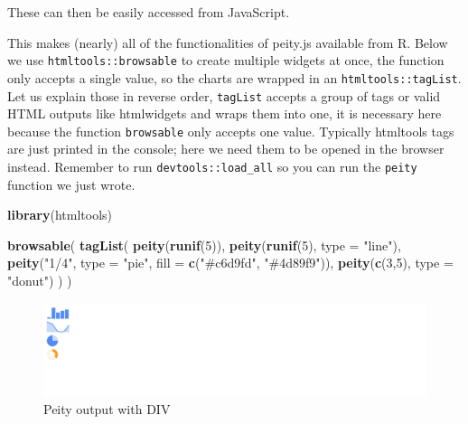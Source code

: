 \documentclass[
]{krantz}
\makeatletter
\newenvironment{Shaded}{\begin{snugshade}}{\end{snugshade}}
\newcommand{\AttributeTok}[1]{\textcolor[rgb]{0.61,0.61,0.61}{#1}}
\newcommand{\DataTypeTok}[1]{\textcolor[rgb]{0.27,0.27,0.27}{#1}}
\newcommand{\DecValTok}[1]{\textcolor[rgb]{0.06,0.06,0.06}{#1}}
\newcommand{\KeywordTok}[1]{\textcolor[rgb]{0.27,0.27,0.27}{\textbf{#1}}}
\newcommand{\NormalTok}[1]{#1}
\newcommand{\OperatorTok}[1]{\textcolor[rgb]{0.43,0.43,0.43}{\textbf{#1}}}
\newcommand{\StringTok}[1]{\textcolor[rgb]{0.5,0.5,0.5}{#1}}
\newcommand{\VariableTok}[1]{\textcolor[rgb]{0,0,0}{#1}}
\newenvironment{kframe}{%
\medskip{}
\setlength{\fboxsep}{.8em}
 \def\at@end@of@kframe{}%
 \ifinner\ifhmode%
  \def\at@end@of@kframe{\end{minipage}}%
  \begin{minipage}{\columnwidth}%
 \fi\fi%
 \def\FrameCommand##1{\hskip\@totalleftmargin \hskip-\fboxsep
 \colorbox{shadecolor}{##1}\hskip-\fboxsep
     \hskip-\linewidth \hskip-\@totalleftmargin \hskip\columnwidth}%
 \MakeFramed {\advance\hsize-\width
   \@totalleftmargin\z@ \linewidth\hsize
   \@setminipage}}%
 {\par\unskip\endMakeFramed%
 \at@end@of@kframe}
\renewenvironment{Shaded}{\begin{kframe}}{\end{kframe}}
\makeatother
\begin{document}
These can then be easily accessed from JavaScript.

\begin{Shaded}
\end{Shaded}

This makes (nearly) all of the functionalities of peity.js available from R. Below we use \texttt{htmltools::browsable} to create multiple widgets at once, the function only accepts a single value, so the charts are wrapped in an \texttt{htmltools::tagList}. Let us explain those in reverse order, \texttt{tagList} accepts a group of tags or valid HTML outputs like htmlwidgets and wraps them into one, it is necessary here because the function \texttt{browsable} only accepts one value. Typically htmltools tags are just printed in the console; here we need them to be opened in the browser instead. Remember to run \texttt{devtools::load\_all} so you can run the \texttt{peity} function we just wrote.

\begin{Shaded}
\begin{Highlighting}[]
\KeywordTok{library}\NormalTok{(htmltools)}

\KeywordTok{browsable}\NormalTok{(}
  \KeywordTok{tagList}\NormalTok{(}
    \KeywordTok{peity}\NormalTok{(}\KeywordTok{runif}\NormalTok{(}\DecValTok{5}\NormalTok{)),}
    \KeywordTok{peity}\NormalTok{(}\KeywordTok{runif}\NormalTok{(}\DecValTok{5}\NormalTok{), }\DataTypeTok{type =} \StringTok{"line"}\NormalTok{),}
    \KeywordTok{peity}\NormalTok{(}\StringTok{"1/4"}\NormalTok{, }\DataTypeTok{type =} \StringTok{"pie"}\NormalTok{, }\DataTypeTok{fill =} \KeywordTok{c}\NormalTok{(}\StringTok{"\#c6d9fd"}\NormalTok{, }\StringTok{"\#4d89f9"}\NormalTok{)),}
    \KeywordTok{peity}\NormalTok{(}\KeywordTok{c}\NormalTok{(}\DecValTok{3}\NormalTok{,}\DecValTok{5}\NormalTok{), }\DataTypeTok{type =} \StringTok{"donut"}\NormalTok{)}
\NormalTok{  )}
\NormalTok{)}
\end{Highlighting}
\end{Shaded}

\begin{figure}[t]

{\centering \includegraphics[width=1\linewidth]{images/peity-div} 

}

\caption{Peity output with DIV}\label{fig:peity-divs}
\end{figure}
\end{document}
